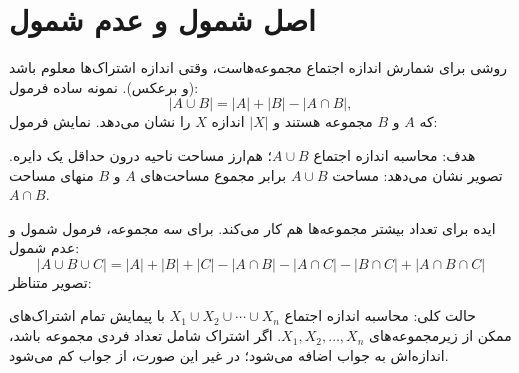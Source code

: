 \section{اصل شمول و عدم شمول}


 روشی برای
شمارش اندازه اجتماع مجموعه‌هاست،
وقتی اندازه اشتراک‌ها معلوم باشد (و برعکس).
نمونه ساده فرمول:
\[ |A \cup B| = |A| + |B| - |A \cap B|,\]
که $A$ و $B$ مجموعه هستند و $|X|$
اندازه $X$ را نشان می‌دهد.
نمایش فرمول:

\begin{center}
\end{center}

هدف: محاسبه اندازه اجتماع $A \cup B$؛
هم‌ارز مساحت ناحیه درون حداقل یک دایره.
تصویر نشان می‌دهد: مساحت $A \cup B$ برابر
مجموع مساحت‌های $A$ و $B$ منهای
مساحت $A \cap B$.

ایده برای تعداد بیشتر مجموعه‌ها هم کار می‌کند.
برای سه مجموعه، فرمول شمول و عدم شمول:
\[ |A \cup B \cup C| = |A| + |B| + |C| - |A \cap B|  - |A \cap C|  - |B \cap C| + |A \cap B \cap C| \]
تصویر متناظر:

\begin{center}
\end{center}

حالت کلی: محاسبه اندازه اجتماع
$X_1 \cup X_2 \cup \cdots \cup X_n$
با پیمایش تمام اشتراک‌های ممکن از زیرمجموعه‌های
$X_1,X_2,\ldots,X_n$.
اگر اشتراک شامل تعداد فردی مجموعه باشد،
اندازه‌اش به جواب اضافه می‌شود؛
در غیر این صورت، از جواب کم می‌شود.

